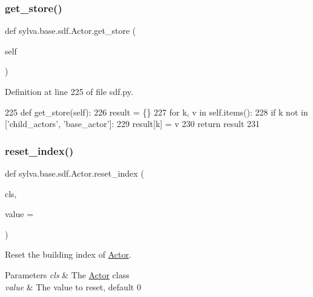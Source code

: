 \subsubsection{\texorpdfstring{get\+\_\+store()}{get\_store()}}
{\footnotesize\ttfamily def sylva.\+base.\+sdf.\+Actor.\+get\+\_\+store (\begin{DoxyParamCaption}\item[{}]{self }\end{DoxyParamCaption})}



Definition at line 225 of file sdf.\+py.


\begin{DoxyCode}
225     \textcolor{keyword}{def }get\_store(self):
226         result = \{\}
227         \textcolor{keywordflow}{for} k, v \textcolor{keywordflow}{in} self.items():
228             \textcolor{keywordflow}{if} k \textcolor{keywordflow}{not} \textcolor{keywordflow}{in} [\textcolor{stringliteral}{'child\_actors'}, \textcolor{stringliteral}{'base\_actor'}]:
229                 result[k] = v
230         \textcolor{keywordflow}{return} result
231 
\end{DoxyCode}
\mbox{\label{classsylva_1_1base_1_1sdf_1_1_actor_a944374756e18d763022664b8bc26d77f}} 
\subsubsection{\texorpdfstring{reset\+\_\+index()}{reset\_index()}}
{\footnotesize\ttfamily def sylva.\+base.\+sdf.\+Actor.\+reset\+\_\+index (\begin{DoxyParamCaption}\item[{}]{cls,  }\item[{}]{value = {} }\end{DoxyParamCaption})}



Reset the building index of \hyperlink{classsylva_1_1base_1_1sdf_1_1_actor}{Actor}. 


\begin{DoxyParams}{Parameters}
{\em cls} & The \hyperlink{classsylva_1_1base_1_1sdf_1_1_actor}{Actor} class \\
\hline
{\em value} & The value to reset, default 0 \\
\hline
\end{DoxyParams}


